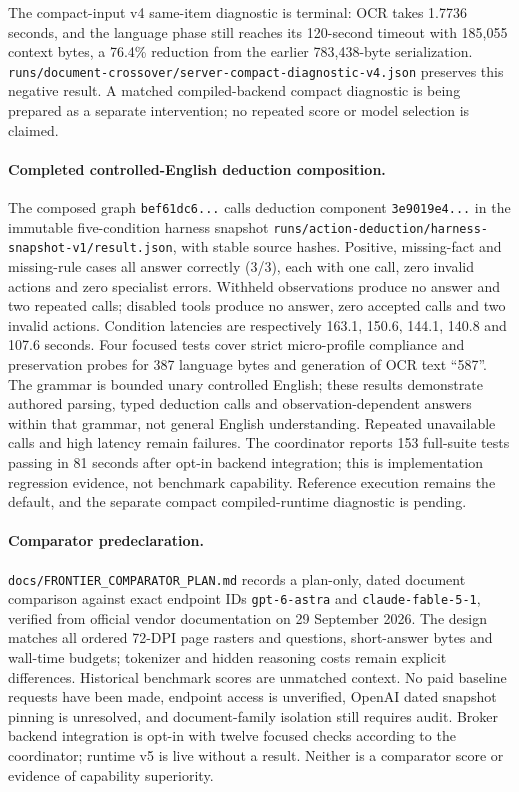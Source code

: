 \documentclass[11pt]{article}
\begin{document}
The compact-input v4 same-item diagnostic is terminal: OCR takes 1.7736 seconds,
and the language phase still reaches its 120-second timeout with 185{,}055
context bytes, a 76.4\% reduction from the earlier 783{,}438-byte serialization.
\texttt{runs/document-crossover/server-compact-diagnostic-v4.json} preserves
this negative result. A matched compiled-backend compact diagnostic is being
prepared as a separate intervention; no repeated score or model selection is
claimed.

\paragraph{Completed controlled-English deduction composition.}
The composed graph \texttt{bef61dc6...} calls deduction component
\texttt{3e9019e4...} in the immutable five-condition harness snapshot
\texttt{runs/action-deduction/harness-snapshot-v1/result.json}, with stable
source hashes. Positive, missing-fact and missing-rule cases all answer
correctly (3/3), each with one call, zero invalid actions and zero specialist
errors. Withheld observations produce no answer and two repeated calls;
disabled tools produce no answer, zero accepted calls and two invalid actions.
Condition latencies are respectively 163.1, 150.6, 144.1, 140.8 and 107.6
seconds. Four focused tests cover strict micro-profile compliance and
preservation probes for 387 language bytes and generation of OCR text ``587''.
The grammar is
bounded unary controlled English; these results demonstrate authored parsing,
typed deduction calls and observation-dependent answers within that grammar,
not general English understanding. Repeated unavailable calls and high latency
remain failures. The coordinator reports 153 full-suite tests passing in
81 seconds after opt-in backend integration; this is implementation regression
evidence, not benchmark capability. Reference execution remains the default,
and the separate compact compiled-runtime diagnostic is pending.

\paragraph{Comparator predeclaration.}
\texttt{docs/FRONTIER\_COMPARATOR\_PLAN.md} records a plan-only, dated
document comparison against exact endpoint IDs \texttt{gpt-6-astra} and
\texttt{claude-fable-5-1}, verified from official vendor documentation on
29 September 2026. The design matches all ordered 72-DPI page rasters and
questions, short-answer bytes and wall-time budgets; tokenizer and hidden
reasoning costs remain explicit differences. Historical benchmark scores are
unmatched context. No paid baseline requests have been made, endpoint access
is unverified, OpenAI dated snapshot pinning is unresolved, and document-family
isolation still requires audit. Broker backend integration is opt-in with twelve
focused checks according to the coordinator; runtime v5 is live without a result.
Neither is a comparator score or evidence of capability superiority.
\end{document}
